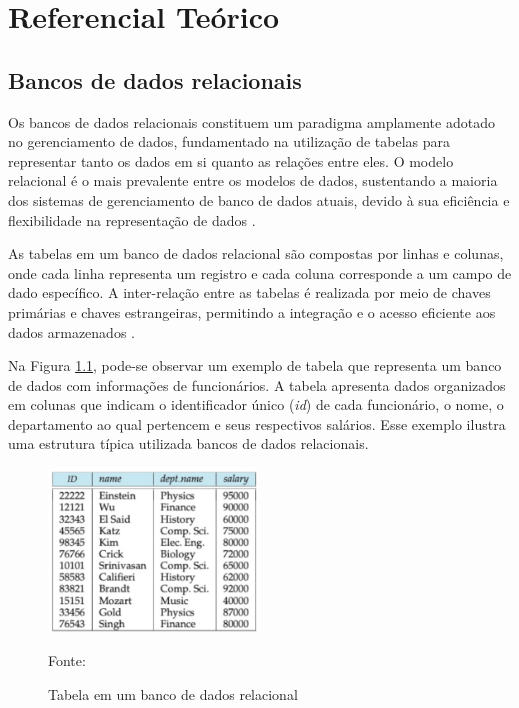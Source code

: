 \chapter[Referencial Teórico]{Referencial Teórico}
\label{sec:referencial}

\section{Bancos de dados relacionais}

Os bancos de dados relacionais constituem um paradigma amplamente adotado no gerenciamento de dados, fundamentado na utilização de tabelas para representar tanto os dados em si quanto as relações entre eles. O modelo relacional é o mais prevalente entre os modelos de dados, sustentando a maioria dos sistemas de gerenciamento de banco de dados atuais, devido à sua eficiência e flexibilidade na representação de dados \cite{silberschatz2011database}.

As tabelas em um banco de dados relacional são compostas por linhas e colunas, onde cada linha representa um registro e cada coluna corresponde a um campo de dado específico. A inter-relação entre as tabelas é realizada por meio de chaves primárias e chaves estrangeiras, permitindo a integração e o acesso eficiente aos dados armazenados \cite{silberschatz2011database}.

Na Figura \ref{fig:exemplo}, pode-se observar um exemplo de tabela que representa um banco de dados com informações de funcionários. A tabela apresenta dados organizados em colunas que indicam o identificador único (\textit{id}) de cada funcionário, o nome, o departamento ao qual pertencem e seus respectivos salários. Esse exemplo ilustra uma estrutura típica utilizada bancos de dados relacionais.

\begin{figure}[H]
    \centering
    \includegraphics[width=0.5\textwidth]{figuras/tabela_silbershatz.eps}
    \caption{Tabela em um banco de dados relacional}
    Fonte: \cite{silberschatz2011database}
    \label{fig:exemplo}
\end{figure}

